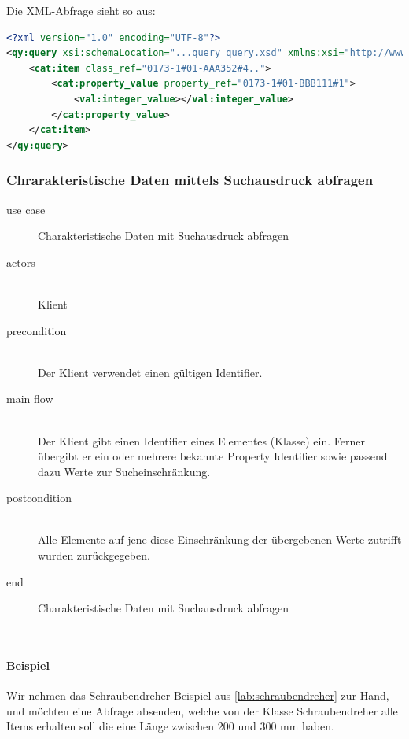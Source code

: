 Die XML-Abfrage sieht so aus:

\begin{lstlisting}[caption=Query Beispiel - Daten abfragen, language=XML, label=UseCaseDatenabfragen]
<?xml version="1.0" encoding="UTF-8"?>
<qy:query xsi:schemaLocation="...query query.xsd" xmlns:xsi="http://www.w3.org/2001/XMLSchema-instance" xmlns:cat="...catalogue" xmlns:val="...value" xmlns:qy="...query" xmlns:bas="...basic">
	<cat:item class_ref="0173-1#01-AAA352#4..">
		<cat:property_value property_ref="0173-1#01-BBB111#1">
			<val:integer_value></val:integer_value>
		</cat:property_value>
	</cat:item>
</qy:query>
\end{lstlisting}

\subsubsection{Chrarakteristische Daten mittels Suchausdruck abfragen }

{\small

\begin{description}
     \item[use case] Charakteristische Daten mit Suchausdruck abfragen
     \item[  actors]~\\
     Klient
     \item[  precondition]~\\
     Der Klient verwendet einen gültigen Identifier.
     \item[  main flow]~\\
     Der Klient gibt einen Identifier eines Elementes (Klasse) ein. Ferner übergibt er ein oder mehrere bekannte Property Identifier sowie passend dazu Werte zur Sucheinschränkung. 
     \item[  postcondition]~\\
     Alle Elemente auf jene diese Einschränkung der übergebenen Werte zutrifft wurden zurückgegeben. 
     \item[end] Charakteristische Daten mit Suchausdruck abfragen
\end{description}

~\\

} %

\paragraph{Beispiel}

Wir nehmen das Schraubendreher Beispiel aus \ref{lab:schraubendreher} zur Hand, und möchten eine Abfrage absenden, welche von der Klasse Schraubendreher alle Items erhalten soll die eine Länge zwischen 200 und 300 mm haben. 


